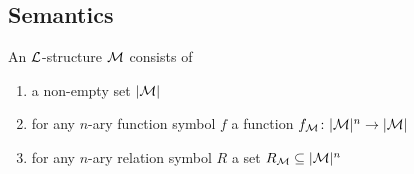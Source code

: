 \subsection{Semantics}

\begin{boxdef}
\begin{defi}
    An \alert{$\mathcal{L}$-structure} $\mathcal{M}$ consists of 
    \begin{enumerate}
        \item a non-empty set $\lvert \mathcal{M} \rvert$
        \item for any $n$-ary function symbol $f$ a function $f_{\mathcal{M}} \colon \lvert \mathcal{M} \rvert^n \to \lvert \mathcal{M} \rvert$
        \item for any $n$-ary relation symbol $R$ a set $R_{\mathcal{M}} \subseteq \lvert \mathcal{M} \rvert^n$
    \end{enumerate}
\end{defi}
\end{boxdef}

